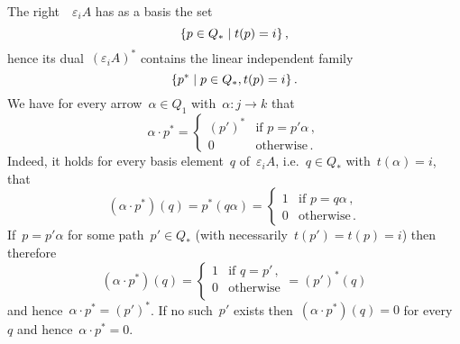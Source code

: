 \begin{remark*}
\begin{enumerate}
      The right~{}~$\varepsilon_i A$ has as a basis the set
      \begin{equation}
        \label{original basis}
        \{
          p \in Q_*
        \suchthat
          t(p) = i
        \}  \,,
      \end{equation}
      hence its dual~$(\varepsilon_i A)^*$ contains the linear independent family
      \begin{equation}
        \label{dual basis}
        \{
          p^*
        \suchthat
          p \in Q_*,
          t(p) = i
        \}  \,.
      \end{equation}
      We have for every arrow~$\alpha \in Q_1$ with~$\alpha \colon j \to k$ that
      \begin{equation}
        \label{dual multiplication rule}
        \alpha \cdot p^*
        =
        \begin{cases}
          (p')^*  & \text{if~$p = p' \alpha$}  \,, \\
          0       & \text{otherwise}  \,.
        \end{cases}
      \end{equation}
      Indeed, it holds for every basis element~$q$ of~$\varepsilon_i A$, i.e.~$q \in Q_*$ with~$t(\alpha) = i$, that
      \[
        (\alpha \cdot p^*)(q)
        =
        p^*(q \alpha)
        =
        \begin{cases}
          1 & \text{if~$p = q \alpha$}  \,, \\
          0 & \text{otherwise}  \,.
        \end{cases}
      \]
      If~$p = p' \alpha$ for some path~$p' \in Q_*$ (with necessarily~$t(p') = t(p) = i$) then therefore
      \[
        (\alpha \cdot p^*)(q)
        =
        \begin{cases}
          1 & \text{if~$q = p'$}  \,, \\
          0 & \text{otherwise}        \\
        \end{cases}
        =
        (p')^*(q)
      \]
      and hence~$\alpha \cdot p^* = (p')^*$.
      If no such~$p'$ exists then~$(\alpha \cdot p^*)(q) = 0$ for every~$q$ and hence~$\alpha \cdot p^* = 0$.
      

\end{enumerate}
\end{remark*}
